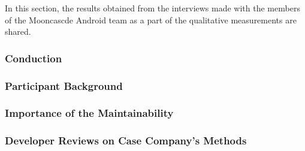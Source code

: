 In this section, the results obtained from the interviews made with the members of the Mooncascde Android team as a part of the qualitative measurements are shared.

\subsubsection{Conduction}


\subsubsection{Participant Background}


\subsubsection{Importance of the Maintainability}


\subsubsection{Developer Reviews on Case Company's Methods}
